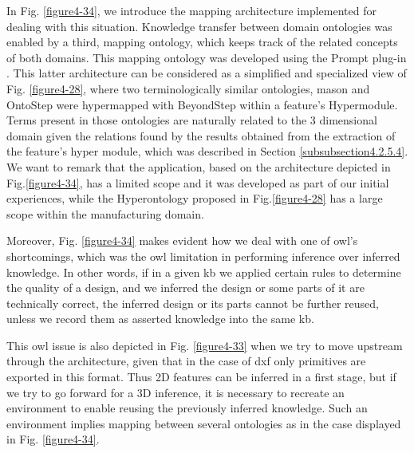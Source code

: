 In Fig. \ref{figure4-34}, we introduce the mapping architecture implemented for dealing with this situation. Knowledge transfer between domain ontologies was enabled by a third, mapping ontology, which keeps track of the related concepts of both domains. This mapping ontology was developed using the Prompt plug-in \cite{noy_prompt_2003}. This latter architecture can be considered as a simplified and specialized view of Fig. \ref{figure4-28}, where two terminologically similar ontologies, \gls{mason} and OntoStep were hypermapped with BeyondStep within a feature’s Hypermodule. Terms present in those ontologies are naturally related to the 3 dimensional domain given the relations found by the results obtained from the extraction of the feature’s hyper module, which was described in Section \ref{subsubsection4.2.5.4}. We want to remark that the application, based on the architecture depicted in Fig.\ref{figure4-34}, has a limited scope and it was developed as part of our initial experiences, while the Hyperontology proposed in Fig.\ref{figure4-28} has a large scope within the manufacturing domain. 

Moreover, Fig. \ref{figure4-34} makes evident how we deal with one of \gls{owl}’s shortcomings, which was the \gls{owl} limitation in performing inference over inferred knowledge. In other words, if in a given \gls{kb} we applied certain rules to determine the quality of a design, and we inferred the design or some parts of it are technically correct, the inferred design or its parts cannot be further reused, unless we record them as asserted knowledge into the same \gls{kb}. 

This \gls{owl} issue is also depicted in Fig. \ref{figure4-33} when we try to move upstream through the architecture, given that in the case of \gls{dxf} only primitives are exported in this format. Thus 2D features can be inferred in a first stage, but if we try to go forward for a 3D inference, it is necessary to recreate an environment to enable reusing the previously inferred knowledge. Such an environment implies mapping between  several ontologies as in the case displayed in Fig. \ref{figure4-34}. 


